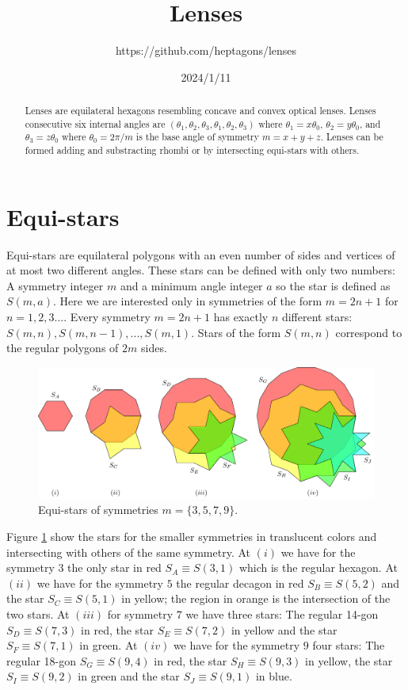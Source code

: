 \documentclass[11pt]{article}
\title{Lenses}
\author{https://github.com/heptagons/lenses}
\date{2024/1/11}
\begin{document}
\maketitle
\begin{abstract}
Lenses are equilateral hexagons resembling concave and convex optical lenses. Lenses consecutive six internal angles are $(\theta_1,\theta_2,\theta_3,\theta_1,\theta_2,\theta_3)$ where $\theta_1 = x\theta_0$, $\theta_2 = y\theta_0$, and $\theta_3 = z\theta_0$ where $\theta_0 = 2\pi/m$ is the base angle of symmetry $m = x + y + z$. Lenses can be formed adding and substracting rhombi or by intersecting equi-stars with others.
\end{abstract}

\section{Equi-stars}

Equi-stars are equilateral polygons with an even number of sides and vertices of at most two different angles. These stars can be defined with only two numbers: A symmetry integer $m$ and a minimum angle integer $a$ so the star is defined as $S(m,a)$. Here we are interested only in symmetries of the form $m=2n+1$ for $n=1,2,3...$. Every symmetry $m=2n+1$ has exactly $n$ different stars: $S(m,n),S(m,n-1),...,S(m,1)$. Stars of the form $S(m,n)$ correspond to the regular polygons of $2m$ sides.

\begin{figure}[H]
\centering
\includegraphics[scale=1]{stars/stars}
\caption{Equi-stars of symmetries $m=\{3,5,7,9\}$.}
\label{fig:stars}
\end{figure}

Figure \ref{fig:stars} show the stars for the smaller symmetries in translucent colors and intersecting with others of the same symmetry. At $(i)$ we have for the symmetry $3$ the only star in red $S_A \equiv S(3,1)$ which is the regular hexagon. At $(ii)$ we have for the symmetry $5$ the regular decagon in red $S_B \equiv S(5,2)$ and the star $S_C \equiv S(5,1)$ in yellow; the region in orange is the intersection of the two stars. At $(iii)$ for symmetry $7$ we have three stars: The regular 14-gon $S_D \equiv S(7,3)$ in red, the star $S_E \equiv S(7,2)$ in yellow and the star $S_F \equiv S(7,1)$ in green. At $(iv)$ we have for the symmetry $9$ four stars: The regular 18-gon $S_G \equiv S(9,4)$ in red, the star $S_H \equiv S(9,3)$ in yellow, the star $S_I \equiv S(9,2)$ in green and the star $S_J \equiv S(9,1)$ in blue.
\end{document}
